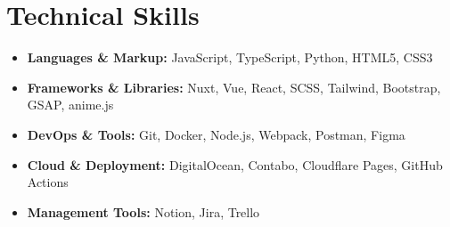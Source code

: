 \section*{Technical Skills}
%
%
%
\begin{itemize}
	\item \textbf{Languages \& Markup:} JavaScript, TypeScript, Python, HTML5, CSS3
	\item \textbf{Frameworks \& Libraries:} Nuxt, Vue, React, SCSS, Tailwind, Bootstrap, GSAP, anime.js
	\item \textbf{DevOps \& Tools:} Git, Docker, Node.js, Webpack, Postman, Figma
	\item \textbf{Cloud \& Deployment:} DigitalOcean, Contabo, Cloudflare Pages, GitHub Actions
	\item \textbf{Management Tools:} Notion, Jira, Trello
\end{itemize}
